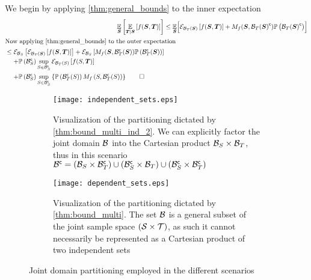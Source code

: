 \begin{proofE}
	We begin by applying \cref{thm:general_bounds} to the inner expectation
	\begin{align*}
		\expectation{\expectation{f(\RV,\RVI)}{\RVI\mid\RV}}{\RV} & \leq \E_{\RV}\Bigl[\partialexpectation{f(\RV,\RVI)}{\subSpaceI{\variableI}(\RV)}+M_f(\RV,\stcomp{\subSpaceI{\variableI}(\RV)})\measure{\stcomp{\subSpaceI{\variableI}(\RV)}}\Bigr]\\
		\intertext{Now applying \cref{thm:general_bounds} to the outer expectation}
		\begin{split}
			&\leq\partialexpectation{\partialexpectation{f(\RV,\RVI)}{\subSpaceI{\variableI}(\RV)}}{\subSpaceI{\variable}}
			+\partialexpectation{M_f(\RV,\stcompI{\subSpace}{\variableI}(\RV))\measure{\stcompI{\subSpace}{\variableI}(\RV)}}{\subSpaceI{\variable}}
			\\
			& \phantomeq+\measure{\stcompI{\subSpace}{\variable}}\sup_{\variable\in\stcompI{\subSpace}{\variable}}\partialexpectation{f(\variable,\RVI)}{\subSpaceI{\variableI}(\variable)}\\
			&\phantomeq
			+\measure{\stcompI{\subSpace}{\variable}}\sup_{\variable\in\stcompI{\subSpace}{\variable}}\left\{\measure{\stcompI{\subSpace}{\variableI}(\variable)}M_f\left(\variable,\stcompI{\subSpace}{\variableI}(\variable)\right)\right\}\qed
		\end{split}
	\end{align*}
\end{proofE}

\begin{figure*} [h]
	\centering
	\begin{subfigure}[t]{0.45\textwidth}
		\centering
		\texttt{[image: independent\_sets.eps]}
		\caption{Visualization of the partitioning dictated by \cref{thm:bound_multi_ind_2}. We can explicitly factor the joint domain $\mathcal B$ into the Cartesian product $\mathcal{B}_{S}\times\mathcal{B}_{T}$, thus in this scenario ${\mathcal B}^{\mathsf{c}}=\left(\mathcal{B}_{S}\times{\ensuremath{\mathcal B}}^{\mathsf{c}}_{T}\right)\cup\left({\mathcal B}^{\mathsf{c}}_{S}\times\mathcal{B}_{T}\right)\cup\left({\mathcal B}^{\mathsf{c}}_{S}\times{\ensuremath{\mathcal B}}^{\mathsf{c}}_{T}\right)$}
		\label{fig:ind_sets}
	\end{subfigure}
	\hfill
	\begin{subfigure}[t]{0.45\textwidth}
		\centering
		\texttt{[image: dependent\_sets.eps]}
		\caption{Visualization of the partitioning dictated by \cref{thm:bound_multi}. The set $\mathcal B$ is a general subset of the joint sample space $(\mathcal S\times\mathcal T)$, as such it cannot necessarily be represented as a Cartesian product of two independent sets}
		\label{fig:dep_sets}
	\end{subfigure}
	\caption{Joint domain partitioning employed in the different scenarios}
	\label{fig:sets}
\end{figure*}


